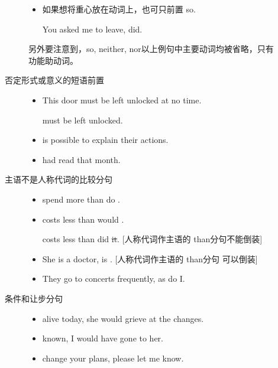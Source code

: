 \begin{description}
\begin{description}
\begin{itemize}
    \item 如果想将重心放在动词上，也可只前置 so.

      You asked me to leave,   did.
    \end{itemize}

    另外要注意到，so, neither, nor以上例句中主要动词均被省略，只有功能助动词。

  \item[否定形式或意义的短语前置]
    \begin{itemize}
    \item This door must be left unlocked at no time.

       must  be left unlocked.

    \item {} is  possible to explain their actions.

    \item {} had  read that month.
    \end{itemize}

  \item[主语不是人称代词的比较分句]
    \begin{itemize}

    \item {} spend more than do .

    \item {} costs less than would .

       costs less than did \sout{it}. [人称代词作主语的 than分句不能倒装]

    \item She is a doctor,  is . [人称代词作主语的 than分句
      可以倒装]

    \item They go to concerts frequently, as do I.

    \end{itemize}

  \item[条件和让步分句]
    \begin{itemize}
    \item {}  alive today, she would grieve at the changes.
    \item {}  known, I would have gone to her.
    \item {}  change your plans, please let me know.
    \end{itemize}
  \end{description}
\end{description}

